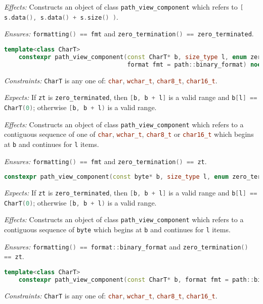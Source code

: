 \documentclass[11pt]{article}
\newcommand{\code}[2][cpp]{\lstinline[language=#1,basicstyle=\small\ttfamily]{#2}}
\newcommand{\desc}[1]{\textit{#1}}
\newcommand{\constraints}{\desc{Constraints: }}
\newcommand{\effects}{\desc{Effects: }}
\newcommand{\expects}{\desc{Expects: }}
\newcommand{\ensures}{\desc{Ensures: }}
\begin{document}
\effects Constructs an object of class \code{path_view_component} which refers to \code{[ s.data(), s.data() + s.size() )}.

\ensures \code{formatting() == fmt} and \code{zero_termination() == zero_terminated}.\\

\begin{lstlisting}[language=cpp]
    template<class CharT>
    constexpr path_view_component(const CharT* b, size_type l, enum zero_termination zt,
                                  format fmt = path::binary_format) noexcept;
\end{lstlisting}
\constraints \code{CharT} is any one of: \code{char}, \code{wchar_t}, \code{char8_t}, \code{char16_t}.

\expects If \code{zt} is \code{zero_terminated}, then \code{[b, b + l]} is a valid range and \code{b[l] == CharT(0)}; otherwise \code{[b, b + l)} is a valid range.

\effects Constructs an object of class \code{path_view_component} which refers to a contiguous sequence of one of \code{char}, \code{wchar_t}, \code{char8_t} or \code{char16_t} which begins at \code{b} and continues for \code{l} items.

\ensures \code{formatting() == fmt} and \code{zero_termination() == zt}.\\

\begin{lstlisting}[language=cpp]
    constexpr path_view_component(const byte* b, size_type l, enum zero_termination zt) noexcept;
\end{lstlisting}

\expects If \code{zt} is \code{zero_terminated}, then \code{[b, b + l]} is a valid range and \code{b[l] == CharT(0)}; otherwise \code{[b, b + l)} is a valid range.

\effects Constructs an object of class \code{path_view_component} which refers to a contiguous sequence of \code{byte} which begins at \code{b} and continues for \code{l} items.

\ensures \code{formatting() == format::binary_format} and \code{zero_termination() == zt}.\\


\begin{lstlisting}[language=cpp]
    template<class CharT>
    constexpr path_view_component(const CharT* b, format fmt = path::binary_format) noexcept;
\end{lstlisting}
\constraints \code{CharT} is any one of: \code{char}, \code{wchar_t}, \code{char8_t}, \code{char16_t}.
\end{document}
